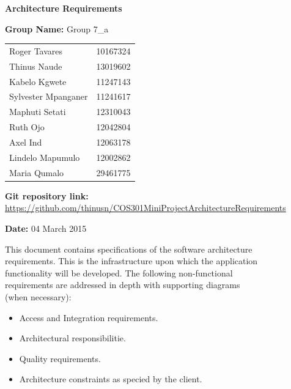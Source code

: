 \documentclass[a4paper,12pt,titlepage]{article}
\begin{document}
\begin{center}

\Huge\textbf{Architecture Requirements\\}
																											
\vspace{2 cm}

\LARGE\textbf{Group Name:} Group 7\_a\newline
 
\vspace{0.5 cm}
\begin{tabular}{lr}
Roger Tavares&10167324\\
Thinus Naude&13019602 \\
Kabelo Kgwete&11247143\\
Sylvester Mpanganer&11241617\\
Maphuti Setati&12310043\\
Ruth Ojo&12042804\\
Axel Ind&12063178\\
Lindelo Mapumulo&12002862\\
Maria Qumalo&29461775\\
\end{tabular}

\vspace{1cm}
\textbf{Git repository link:\\}
\url{https://github.com/thinusn/COS301MiniProjectArchitectureRequirements}

\vspace{1cm}
\textbf{Date:} 04 March 2015
\end{center}

\newpage
\tableofcontents


\newpage
\setlength{\voffset}{-3cm}
This document contains specifications of the software architecture 
\\requirements. This is the infrastructure upon which the application
\\ functionality will be developed. The following non-functional
\\ requirements are addressed in depth with supporting diagrams
\\(when necessary):

\begin{itemize}
	\item Access and Integration requirements.
	\item Architectural responsibilitie.
	\item Quality requirements.
	\item Architecture constraints as specied by the client. 
\end{itemize}
\end{document}
